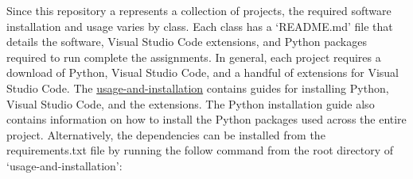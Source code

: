 Since this repository a represents a collection of projects, the required software 
installation and usage varies by class. Each class has a `README.md' file that details 
the software, Visual Studio Code extensions, and Python packages required to run complete 
the assignments. In general, each project requires a download of Python, Visual Studio 
Code, and a handful of extensions for Visual Studio Code. The 
\href{https://github.com/mKiloLA/python-based-mne/tree/master/usage-and-installation}{usage-and-installation} 
contains guides for installing Python, Visual Studio Code, and the extensions. 
The Python installation guide also contains information on how to install the Python 
packages used across the entire project. Alternatively, the dependencies can be 
installed from the requirements.txt file by running the follow command from the root 
directory of `usage-and-installation':

\begin{center}
\end{center}
